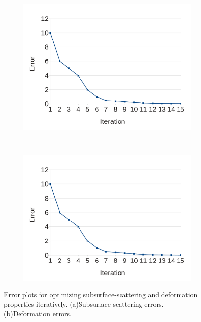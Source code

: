 \documentclass[annual]{acmsiggraph}
\begin{document}
\begin{figure}
\begin{subfigure}[b]{0.3\textwidth}
	\centering
 	\includegraphics[width=\textwidth]{figure/error.pdf}
   	\caption{}
    \label{fig:ssErr}
    \end{subfigure}
    ~
    \begin{subfigure}[b]{0.3\textwidth}
    \centering
  	\includegraphics[width=\textwidth]{figure/error.pdf}
    \caption{}
    \label{fig:deformErr}
\end{subfigure}
\caption{Error plots for
optimizing subsurface-scattering and deformation properties
iteratively. (a)Subsurface scattering errors. (b)Deformation errors.}
\label{fig:err}
\end{figure}
\end{document}
